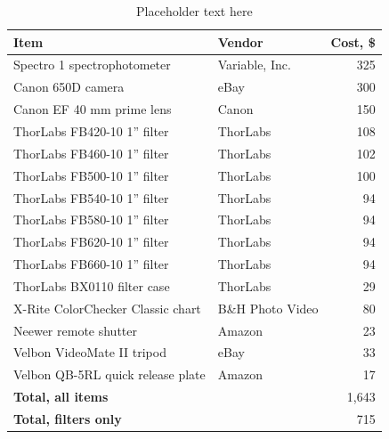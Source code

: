 \documentclass[twocolumn,10pt]{asme2ej}
\begin{document}
\begin{table}[t]
\begin{center}
\begin{tabular}{l l r}
\textbf{Item} & \textbf{Vendor} & \textbf{Cost, \$} \\
\hline
Spectro 1 spectrophotometer       & Variable, Inc. &   325 \\
Canon 650D camera                 & eBay &             300 \\
Canon EF 40 mm prime lens         & Canon &            150 \\
ThorLabs FB420-10 1'' filter      & ThorLabs &         108 \\
ThorLabs FB460-10 1'' filter      & ThorLabs &         102 \\
ThorLabs FB500-10 1'' filter      & ThorLabs &         100 \\
ThorLabs FB540-10 1'' filter      & ThorLabs &         94  \\
ThorLabs FB580-10 1'' filter      & ThorLabs &         94  \\
ThorLabs FB620-10 1'' filter      & ThorLabs &         94  \\
ThorLabs FB660-10 1'' filter      & ThorLabs &         94  \\
ThorLabs BX0110 filter case  & ThorLabs &         29  \\
X-Rite ColorChecker Classic chart         & B\&H Photo Video & 80  \\
Neewer remote shutter             & Amazon &           23  \\
Velbon VideoMate II tripod        & eBay &             33  \\
Velbon QB-5RL quick release plate & Amazon &           17  \\
\hline
\textbf{Total, all items} & & 1,643 \\
\textbf{Total, filters only} & & 715 \\
\end{tabular}
\caption{Placeholder text here}
\label{materials}
\end{center}
\end{table}

\clearpage
\end{document}
